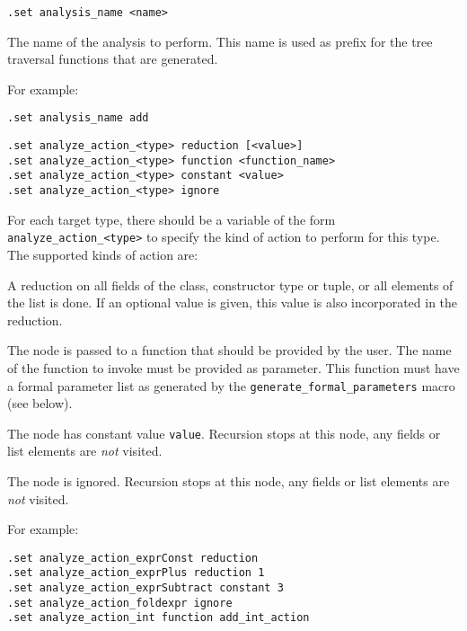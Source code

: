 \begin{verbatim}
.set analysis_name <name>
\end{verbatim}
\begin{desc}
The name of the analysis to perform. This name is used as prefix for
the tree traversal functions that are generated.
\par
For example:
\begin{verbatim}
.set analysis_name add
\end{verbatim}
\end{desc}

\begin{verbatim}
.set analyze_action_<type> reduction [<value>]
.set analyze_action_<type> function <function_name>
.set analyze_action_<type> constant <value>
.set analyze_action_<type> ignore
\end{verbatim}
\begin{desc}
\begin{sloppypar}
For each target type, there should be a variable of the form
\verb'analyze_action_<type>' to specify the kind of action to perform
for this type.  The supported kinds of action are:
\end{sloppypar}
\begin{description}[\breaklabel]
\item[\texttt{reduction}] A reduction on all fields of the class, constructor
type or tuple, or all elements of the list is done. If an optional
value is given, this value is also incorporated in the reduction.
\item[\texttt{function}] The node is passed to a function that should be
provided by the user. The name of the function to invoke must be provided
as parameter. This function must have a formal parameter list
as generated by the \verb'generate_formal_parameters' macro (see below).
\item[\texttt{constant}] The node has constant value \texttt{value}. Recursion
stops at this node, any fields or list elements are \emph{not} visited.
\item[\texttt{ignore}] The node is ignored. Recursion stops at this node,
any fields or list elements are \emph{not} visited.
\end{description}

For example:
\begin{verbatim}
.set analyze_action_exprConst reduction
.set analyze_action_exprPlus reduction 1
.set analyze_action_exprSubtract constant 3
.set analyze_action_foldexpr ignore
.set analyze_action_int function add_int_action
\end{verbatim}
\end{desc}



